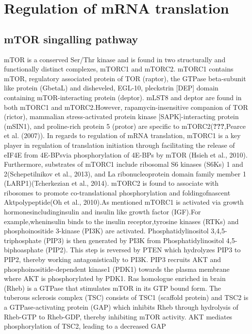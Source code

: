 \documentclass[12pt,openany]{book}
\begin{document}
\section{Regulation of mRNA translation}

\subsection{mTOR singalling pathway}

mTOR is a conserved Ser/Thr kinase and is found in two structurally and
functionally distinct complexes, mTORC1 and mTORC2. mTORC1 contains
mTOR, regulatory associated protein of TOR (raptor), the GTPase
beta-subunit like protein (GbetaL) and disheveled, EGL-10, pleckstrin
{[}DEP{]} domain containing mTOR-interacting protein (deptor). mLST8 and
deptor are found in both mTORC1 and mTORC2.However,
rapamycin-insensitive companion of TOR (rictor), mammalian
stress-activated protein kinase {[}SAPK{]}-interacting protein (mSIN1),
and proline-rich protein 5 (protor) are specific to
mTORC2({\textbf{???}},Pearce et al. (2007)). In regards to regulation of
mRNA translation, mTORC1 is a key player in regulation of translation
initiation through facilitating the release of eIF4E from 4E-BPsvia
phosphorylation of 4E-BPs by mTOR (Hsieh et al., 2010). Furthermore,
substrates of mTORC1 include ribosomal S6 kinases (S6Ks) 1 and
2(Schepetilnikov et al., 2013), and La ribonucleoprotein domain family
member 1 (LARP1)(Tcherkezian et al., 2014). mTORC2 is found to associate
with ribosomes to promote co-translational phosphorylation and
foldingofnascent Aktpolypeptide(Oh et al., 2010).As mentioned mTORC1 is
activated via growth hormonesincludinginsulin and insulin like growth
factor (IGF).For example,wheninsulin binds to the insulin
receptor,tyrosine kinases (RTKs) and phosphoinositide 3-kinase (PI3K)
are activated. Phosphatidylinositol 3,4,5-triphosphate (PIP3) is then
generated by PI3K from Phosphatidylinositol 4,5-biphoasphate (PIP2).
This step is reversed by PTEN which hydrolyzes PIP3 to PIP2, thereby
working antagonistically to PI3K. PIP3 recruits AKT and
phosphoinositide-dependent kinase1 (PDK1) towards the plasma membrane
where AKT is phosphorylated by PDK1. Ras homologue enriched in brain
(Rheb) is a GTPase that stimulates mTOR in its GTP bound form. The
tuberous sclerosis complex (TSC) consists of TSC1 (scaffold protein) and
TSC2 is a GTPase-activating protein (GAP) which inhibits Rheb through
hydrolysis of Rheb-GTP to Rheb-GDP, thereby inhibiting mTOR activity.
AKT mediates phosphorylation of TSC2, leading to a decreased GAP
\end{document}
